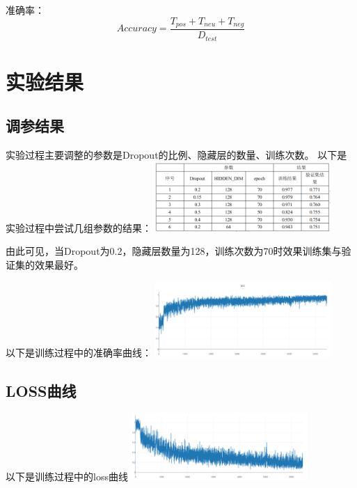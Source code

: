 \documentclass[twocolumn]{ctexart}
\begin{document}
准确率：\begin{equation}
Accuracy=\frac{T_{pos}+T_{neu}+T_{neg}}{D_{test}}
\end{equation}

\section{实验结果}
\subsection{调参结果}
\par 实验过程主要调整的参数是Dropout的比例、隐藏层的数量、训练次数。
以下是实验过程中尝试几组参数的结果：
\includegraphics[width=0.5\textwidth]{p10.png}
\par 由此可见，当Dropout为0.2，隐藏层数量为128，训练次数为70时效果训练集与验证集的效果最好。
\par 以下是训练过程中的准确率曲线：
\includegraphics[width=0.5\textwidth]{p11.png}

\subsection{LOSS曲线}
\par 以下是训练过程中的loss曲线
\includegraphics[width=0.5\textwidth]{p12.png}
\end{document}
